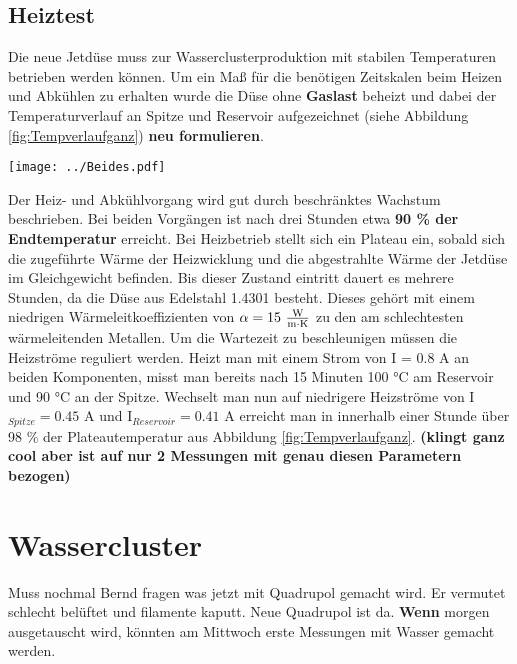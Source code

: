 \subsection{Heiztest}

Die neue Jetdüse muss zur Wasserclusterproduktion mit stabilen Temperaturen betrieben werden können. Um ein Maß für die benötigen Zeitskalen beim Heizen und Abkühlen zu erhalten wurde die Düse ohne \textbf{Gaslast} beheizt und dabei der Temperaturverlauf an Spitze und Reservoir aufgezeichnet (siehe Abbildung \ref{fig:Tempverlaufganz}) \textbf{neu formulieren}. 

\begin{center}
\begin{minipage}{\linewidth}
\centering
\texttt{[image: ../Beides.pdf]}%
 \label{fig:Tempverlaufganz}
\end{minipage} 
\end{center} 

Der Heiz- und Abkühlvorgang wird gut durch beschränktes Wachstum beschrieben. Bei beiden Vorgängen ist nach drei Stunden etwa \textbf{90 \% der Endtemperatur} erreicht. Bei Heizbetrieb stellt sich ein Plateau ein, sobald sich die zugeführte Wärme der Heizwicklung und die abgestrahlte Wärme der Jetdüse im Gleichgewicht befinden. Bis dieser Zustand eintritt dauert es mehrere Stunden, da die Düse aus Edelstahl 1.4301 besteht. Dieses gehört mit einem niedrigen Wärmeleitkoeffizienten von $\alpha = 15\ \frac{\textmd{W}}{\textmd{m}\cdot \textmd{K}}$ zu den am schlechtesten wärmeleitenden Metallen. Um die Wartezeit zu beschleunigen müssen die Heizströme reguliert werden. Heizt man mit einem Strom von I = 0.8 A an beiden Komponenten, misst man bereits nach 15 Minuten 100 °C am Reservoir und 90 °C an der Spitze. Wechselt man nun auf niedrigere Heizströme von I$_{Spitze} = 0.45$ A und I$_{Reservoir} = 0.41$ A erreicht man in innerhalb einer Stunde über 98 \% der Plateautemperatur aus Abbildung \ref{fig:Tempverlaufganz}. \textbf{(klingt ganz cool aber ist auf nur 2 Messungen mit genau diesen Parametern bezogen)}


\section{Wassercluster}

Muss nochmal Bernd fragen was jetzt mit Quadrupol gemacht wird. Er vermutet schlecht belüftet und filamente kaputt. Neue Quadrupol ist da. \textbf{Wenn} morgen ausgetauscht wird, könnten am Mittwoch erste Messungen mit Wasser gemacht werden.

